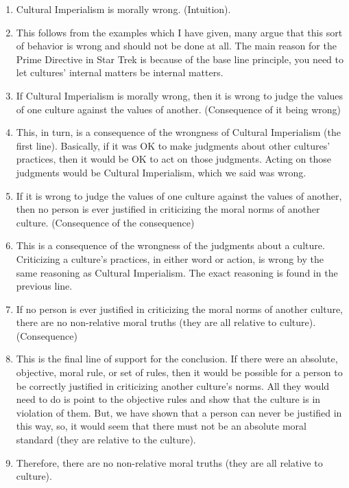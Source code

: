 \begin{enumerate}
    \item Cultural Imperialism is morally wrong. (Intuition).
    \item This follows from the examples which I have given, many argue that this sort of behavior is wrong and should not be done at all. The main reason for the Prime Directive in Star Trek is because of the base line principle, you need to let cultures' internal matters be internal matters. 
    \item If Cultural Imperialism is morally wrong, then it is wrong to judge the values of one culture against the values of another. (Consequence of it being wrong)
    \item This, in turn, is a consequence of the wrongness of Cultural Imperialism (the first line). Basically, if it was OK to make judgments about other cultures' practices, then it would be OK to act on those judgments. Acting on those judgments would be Cultural Imperialism, which we said was wrong.   
    \item If it is wrong to judge the values of one culture against the values of another, then no person is ever justified in criticizing the moral norms of another culture. (Consequence of the consequence)
    \item This is a consequence of the wrongness of the judgments about a culture. Criticizing a culture's practices, in either word or action, is wrong by the same reasoning as Cultural Imperialism. The exact reasoning is found in the previous line. 
    \item If no person is ever justified in criticizing the moral norms of another culture, there are no non-relative moral truths (they are all relative to culture). (Consequence)
    \item This is the final line of support for the conclusion. If there were an absolute, objective, moral rule, or set of rules, then it would be possible for a person to be correctly justified in criticizing another culture's norms. All they would need to do is point to the objective rules and show that the culture is in violation of them. But, we have shown that a person can never be justified in this way, so, it would seem that there must not be an absolute moral standard (they are relative to the culture).
    \item Therefore, there are no non-relative moral truths (they are all relative to culture).
\end{enumerate}

